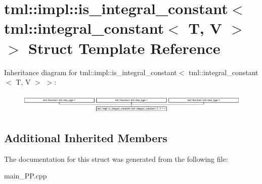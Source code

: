 \hypertarget{structtml_1_1impl_1_1is__integral__constant_3_01tml_1_1integral__constant_3_01T_00_01V_01_4_01_4}{\section{tml\+:\+:impl\+:\+:is\+\_\+integral\+\_\+constant$<$ tml\+:\+:integral\+\_\+constant$<$ T, V $>$ $>$ Struct Template Reference}
\label{structtml_1_1impl_1_1is__integral__constant_3_01tml_1_1integral__constant_3_01T_00_01V_01_4_01_4}
}
Inheritance diagram for tml\+:\+:impl\+:\+:is\+\_\+integral\+\_\+constant$<$ tml\+:\+:integral\+\_\+constant$<$ T, V $>$ $>$\+:\begin{figure}[H]
\begin{center}
\leavevmode
\includegraphics[height=1.006289cm]{structtml_1_1impl_1_1is__integral__constant_3_01tml_1_1integral__constant_3_01T_00_01V_01_4_01_4}
\end{center}
\end{figure}
\subsection*{Additional Inherited Members}


The documentation for this struct was generated from the following file\+:\begin{DoxyCompactItemize}
\item 
main\+\_\+\+P\+P.\+cpp\end{DoxyCompactItemize}
